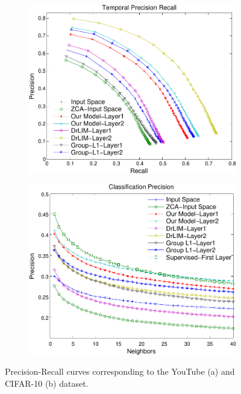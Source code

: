 \documentclass{article} %
\begin{document}
\begin{figure}
  \centering
  \begin{subfigure}[b]{0.45\textwidth}
        \includegraphics[width=\textwidth]{./Rebbutal_Figures/AUC_time-crop.pdf}
        \caption{}
        \label{fig:ROCtime}
  \end{subfigure} 
  \centering
  \begin{subfigure}[b]{0.45\textwidth}
        \includegraphics[width=\textwidth]{./Rebbutal_Figures/AUC_class-crop.pdf}
        \caption{}
        \label{fig:ROCCIFAR}
  \end{subfigure} 
	\caption{Precision-Recall curves corresponding to the YouTube (a) and CIFAR-10 (b) dataset.}
	\label{fig:ROC}
\end{figure}
\end{document}

